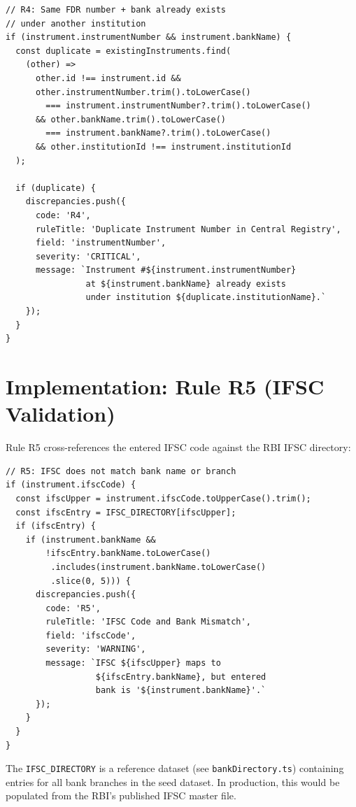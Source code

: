 \documentclass[12pt, a4paper]{report}
\begin{document}
\begin{lstlisting}[caption={Rule R4: Duplicate Detection (rulesEngine.ts, lines 78--99)}, label={lst:r4}]
// R4: Same FDR number + bank already exists
// under another institution
if (instrument.instrumentNumber && instrument.bankName) {
  const duplicate = existingInstruments.find(
    (other) =>
      other.id !== instrument.id &&
      other.instrumentNumber.trim().toLowerCase()
        === instrument.instrumentNumber?.trim().toLowerCase()
      && other.bankName.trim().toLowerCase()
        === instrument.bankName?.trim().toLowerCase()
      && other.institutionId !== instrument.institutionId
  );

  if (duplicate) {
    discrepancies.push({
      code: 'R4',
      ruleTitle: 'Duplicate Instrument Number in Central Registry',
      field: 'instrumentNumber',
      severity: 'CRITICAL',
      message: `Instrument #${instrument.instrumentNumber}
                at ${instrument.bankName} already exists
                under institution ${duplicate.institutionName}.`
    });
  }
}
\end{lstlisting}

\section{Implementation: Rule R5 (IFSC Validation)}

Rule R5 cross-references the entered IFSC code against the RBI IFSC directory:

\begin{lstlisting}[caption={Rule R5: IFSC Validation (rulesEngine.ts, lines 101--133)}, label={lst:r5}]
// R5: IFSC does not match bank name or branch
if (instrument.ifscCode) {
  const ifscUpper = instrument.ifscCode.toUpperCase().trim();
  const ifscEntry = IFSC_DIRECTORY[ifscUpper];
  if (ifscEntry) {
    if (instrument.bankName &&
        !ifscEntry.bankName.toLowerCase()
         .includes(instrument.bankName.toLowerCase()
         .slice(0, 5))) {
      discrepancies.push({
        code: 'R5',
        ruleTitle: 'IFSC Code and Bank Mismatch',
        field: 'ifscCode',
        severity: 'WARNING',
        message: `IFSC ${ifscUpper} maps to
                  ${ifscEntry.bankName}, but entered
                  bank is '${instrument.bankName}'.`
      });
    }
  }
}
\end{lstlisting}

The \texttt{IFSC\_DIRECTORY} is a reference dataset (see \texttt{bankDirectory.ts}) containing entries for all bank branches in the seed dataset. In production, this would be populated from the RBI's published IFSC master file.
\end{document}
